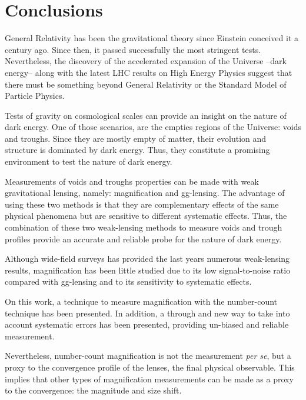 
\chapter{Conclusions}
General Relativity has been the gravitational theory since Einstein conceived it a century ago. Since then, it passed successfully the most stringent tests. Nevertheless, the discovery of the accelerated expansion of the Universe --dark energy-- along with the latest LHC results on High Energy Physics suggest that there must be something beyond General Relativity or the Standard Model of Particle Physics.
\newline

Tests of gravity on cosmological scales can provide an insight on the nature of dark energy. One of those scenarios, are the empties regions of the Universe: voids and troughs. Since they are mostly empty of matter, their evolution and structure is dominated by dark energy. Thus, they constitute a promising environment to test the nature of dark energy.
\newline

Measurements of voids and troughs properties can be made with weak gravitational lensing, namely: magnification and gg-lensing. The advantage of using these two methods is that they are complementary effects of the same physical phenomena but are sensitive to different systematic effects. Thus, the combination of these two weak-lensing methods to measure voids and trough profiles provide an accurate and reliable probe for the nature of dark energy.
\newline

Although wide-field surveys has provided the last years numerous weak-lensing results, magnification has been little studied due to its low signal-to-noise ratio compared with gg-lensing and to its sensitivity to systematic effects.
\newline

On this work, a technique to measure magnification with the number-count technique has been presented. In addition, a through and new way to take into account systematic errors has been presented, providing un-biased and reliable measurement.
\newline

Nevertheless, number-count magnification is not the measurement {\it per se}, but a proxy to the convergence profile of the lenses, the final physical observable. This implies that other types of magnification measurements can be made as a proxy to the convergence: the magnitude and size shift.